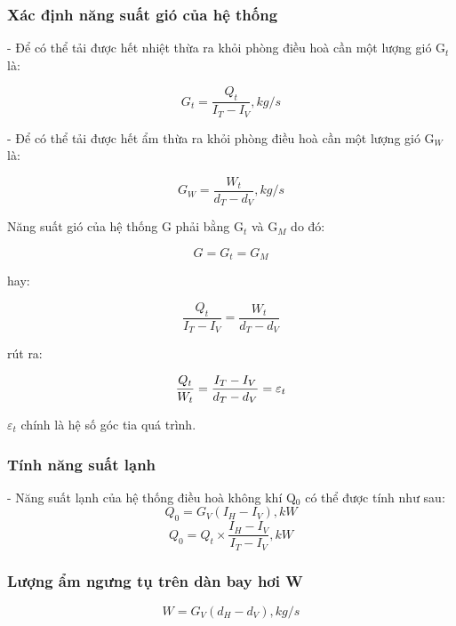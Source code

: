 \subsubsection{Xác định năng suất gió của hệ thống}
- Để có thể tải được hết nhiệt thừa ra khỏi phòng điều hoà cần một lượng gió G$_{t}$ là:

\begin{equation}
	G_{t} = \dfrac{Q_{t}}{I_{T} - I_{V}} , \textit{kg/s}
\end{equation}

- Để có thể tải được hết ẩm thừa ra khỏi phòng điều hoà cần một lượng gió G$_{W}$ là:

\begin{equation}
	 G_{W} = \dfrac{W_{t}}{d_{T} - d_{V}} , \textit{kg/s}
\end{equation}

Năng suất gió của hệ thống G phải bằng G$_{t}$ và G$_{M}$ do đó:

\begin{equation}
	G = G_{t} = G_{M}
\end{equation}

hay:

\begin{equation}
	 \dfrac{Q_{t}}{I_{T} - I_{V}}  = \dfrac{W_{t}}{d_{T} - d_{V}} 
\end{equation}

rút ra:

\begin{equation}
	 \dfrac{Q_{t}}{W_{t}}  =  \dfrac{I_{T} - I_{V}}{d_{T} - d_{V}}  = {\LARGE \varepsilon_{t}}
\end{equation}

{\Large $\varepsilon_{t}$} chính là hệ số góc tia quá trình.

\subsubsection{Tính năng suất lạnh}
- Năng suất lạnh của hệ thống điều hoà không khí Q$ _{0} $ có thể được tính như sau:
\begin{equation}
	Q _{0} = G_{V}(I_{H} - I_{V}), \textit{kW}
\end{equation}
\begin{equation}
	 Q _{0} = Q_{t}\times\dfrac{I_{H} - I_{V}}{I_{T} - I_{V}}, \textit{kW}
\end{equation}


\subsubsection{Lượng ẩm ngưng tụ trên dàn bay hơi W}
\begin{equation}
	W = G_{V}(d_{H}-d_{V}), \textit{kg/s}
\end{equation}

